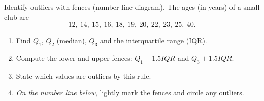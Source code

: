 \documentclass[11pt]{article}
\def\textbf#1{#1}%
\def\mathrm#1{#1}%
\newcounter{question}
\begin{document}
\begin{question}
\textbf{Identify outliers with fences (number line diagram).}
The ages (in years) of a small club are
\[
12,\ 14,\ 15,\ 16,\ 18,\ 19,\ 20,\ 22,\ 23,\ 25,\ 40.
\]
\begin{enumerate}
  \item Find $Q_1$, $Q_2$ (median), $Q_3$ and the interquartile range (IQR).
  \item Compute the lower and upper fences: $Q_1-1.5\mathrm{IQR}$ and $Q_3+1.5\mathrm{IQR}$.
  \item State which values are outliers by this rule.
  \item \emph{On the number line below}, lightly mark the fences and circle any outliers.
\end{enumerate}

\begin{center}
\end{center}
\end{question}

\end{document}
